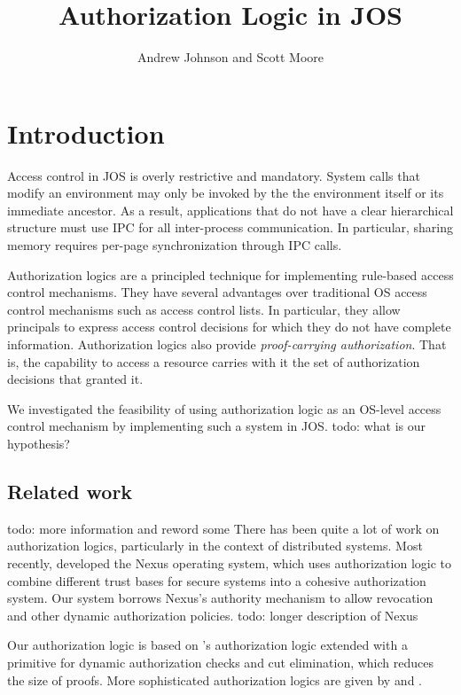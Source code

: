 \documentclass[10pt]{article}
\newcommand{\todo}[1]{{\color{red}todo: {#1}}}
\begin{document}
\title{Authorization Logic in JOS}
\author{Andrew Johnson and Scott Moore}

\maketitle

\thispagestyle{empty}

\section{Introduction}
Access control in JOS is overly restrictive and mandatory. System calls that modify an environment may only be invoked by the the environment itself or its immediate ancestor. As a result, applications that do not have a clear hierarchical structure must use IPC for all inter-process communication. In particular, sharing memory requires per-page synchronization through IPC calls.

Authorization logics are a principled technique for implementing rule-based access control mechanisms.
They have several advantages over traditional OS access control mechanisms such as access control lists.
In particular, they allow principals to express access control decisions for which they do not have complete information.
Authorization logics also provide \emph{proof-carrying authorization}. That is, the capability to access a resource carries with it the set of authorization decisions that granted it.

We investigated the feasibility of using authorization logic as an OS-level access control mechanism by implementing such a system in JOS. \todo{what is our hypothesis?}

\subsection{Related work}
\todo{more information and reword some}
There has been quite a lot of work on authorization logics, particularly in the context of distributed systems.
Most recently, \citet{Nexus} developed the Nexus operating system, which uses authorization logic to combine different trust bases for secure systems into a cohesive authorization system.
Our system borrows Nexus's authority mechanism to allow revocation and other dynamic authorization policies.
\todo{longer description of Nexus}

Our authorization logic is based on \citet{Bauer}'s authorization logic extended with a primitive for dynamic authorization checks and cut elimination, which reduces the size of proofs.
More sophisticated authorization logics are given by \citet{AURA} and \citet{Garg}.
\end{document}
